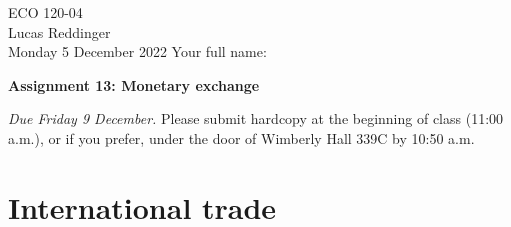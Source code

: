 \documentclass[
    letterpaper,paper=portrait,fleqn,
    DIV=16,fontsize=12pt,twoside=semi,
    parskip=full-,
    headings=standardclasses]
{scrartcl}
\begin{document}
\RaggedRight
\thispagestyle{plain}

ECO 120-04 \\
Lucas Reddinger \\
Monday 5 December 2022 \hfill Your full name: \underline{\hspace{3.25in}}

\vspace{0.7\baselineskip}
\textbf{\LARGE Assignment 13: Monetary exchange}
\vspace{0.3\baselineskip}

\emph{Due Friday 9 December.} Please submit hardcopy at the beginning of class (11:00 a.m.), or if you prefer, under the door of Wimberly Hall 339C by 10:50 a.m.

\section{International trade}
\end{document}
